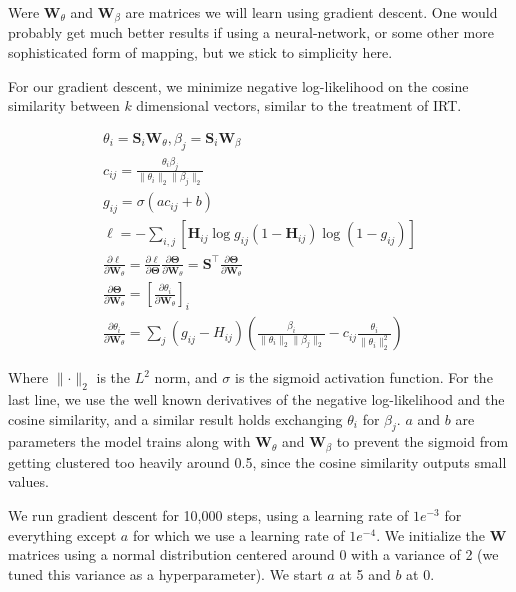 \documentclass[twocolumn]{article}
\begin{document}
Were $\mathbf{W}_\theta$ and $\mathbf{W}_\beta$ are matrices we will learn
using gradient descent. One would probably get much better results if using a
neural-network, or some other more sophisticated form of mapping, but we stick
to simplicity here.

For our gradient descent, we minimize negative log-likelihood on the cosine
similarity between $k$ dimensional vectors, similar to the treatment of IRT.

\begin{gather}
    \theta_i = \mathbf{S}_i \mathbf{W}_\theta,
    \beta_j = \mathbf{S}_i \mathbf{W}_\beta \\
    c_{ij} = \frac{\theta_i \beta_j}
        {\lVert\theta_i\rVert_2 \lVert\beta_j\rVert_2} \\
    g_{ij} = \sigma(ac_{ij} + b) \\
    \ell = - \sum_{i,j} \left[\mathbf{H}_{ij} \log g_{ij}
        (1 - \mathbf{H}_{ij}) \log (1 - g_{ij})\right] \\
    \frac{\partial\ell}{\partial\mathbf{W}_\theta} = 
        \frac{\partial\ell}{\partial\mathbf{\Theta}}
        \frac{\partial\mathbf{\Theta}}{\partial\mathbf{W}_\theta} =
        \mathbf{S}^\top
        \frac{\partial\mathbf{\Theta}}{\partial\mathbf{W}_\theta} \\
    \frac{\partial\mathbf{\Theta}}{\partial\mathbf{W}_\theta} =
        \left[\frac{\partial\theta_i}{\partial\mathbf{W}_\theta}\right]_i \\
    \frac{\partial\theta_i}{\partial\mathbf{W}_\theta} =
    \sum_j \left(g_{ij} - H_{ij}\right)
        \left(\frac{\beta_i}{\lVert\theta_i\rVert_2 \lVert\beta_j\rVert_2}
         - c_{ij}\frac{\theta_i}{\lVert{\theta_i}\rVert_2^2}\right)
\end{gather}


Where $\lVert\cdot\rVert_2$ is the $L^2$ norm, and $\sigma$ is the sigmoid
activation function. For the last line, we use the well known derivatives of
the negative log-likelihood and the cosine similarity, and a similar result
holds exchanging $\theta_i$ for $\beta_j$. $a$ and $b$ are parameters the model
trains along with $\mathbf{W}_\theta$ and $\mathbf{W}_\beta$ to prevent the
sigmoid from getting clustered too heavily around 0.5, since the cosine
similarity outputs small values.

We run gradient descent for 10,000 steps, using a learning rate of $1e^{-3}$
for everything except $a$ for which we use a learning rate of $1e^{-4}$. We
initialize the $\mathbf{W}$ matrices using a normal distribution centered
around 0 with a variance of 2 (we tuned this variance as a hyperparameter). We
start $a$ at 5 and $b$ at 0.
\end{document}
